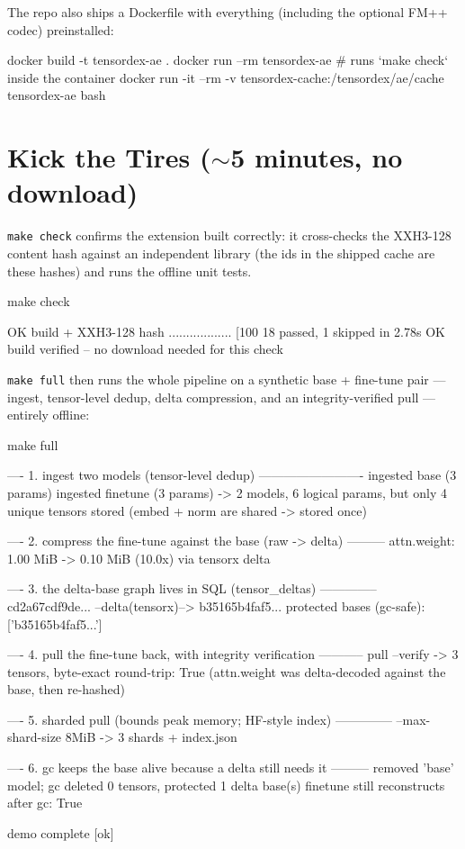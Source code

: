 \documentclass[11pt]{article}
\newcommand{\code}[1]{\texttt{#1}}
\begin{document}
The repo also ships a Dockerfile with everything (including the optional
FM++ codec) preinstalled:

\begin{shell}
docker build -t tensordex-ae .
docker run --rm tensordex-ae     # runs `make check` inside the container
docker run -it --rm -v tensordex-cache:/tensordex/ae/cache tensordex-ae bash
\end{shell}

\section{Kick the Tires ($\sim$5 minutes, no download)}

\code{make check} confirms the extension built correctly: it cross-checks the
XXH3-128 content hash against an independent library (the ids in the shipped
cache are these hashes) and runs the offline unit tests.

\begin{shell}
make check
\end{shell}
\begin{term}
OK  build + XXH3-128 hash
..................                                            [100%
18 passed, 1 skipped in 2.78s
OK  build verified -- no download needed for this check
\end{term}

\code{make full} then runs the whole pipeline on a synthetic base + fine-tune
pair --- ingest, tensor-level dedup, delta compression, and an
integrity-verified pull --- entirely offline:

\begin{shell}
make full
\end{shell}
\begin{term}
---- 1. ingest two models (tensor-level dedup) -------------------------
  ingested base      (3 params)
  ingested finetune  (3 params)
  -> 2 models, 6 logical params, but only 4 unique tensors stored
     (embed + norm are shared -> stored once)

---- 2. compress the fine-tune against the base (raw -> delta) ---------
  attn.weight: 1.00 MiB -> 0.10 MiB (10.0x) via tensorx delta

---- 3. the delta-base graph lives in SQL (tensor_deltas) --------------
  cd2a67cdf9de...  --delta(tensorx)-->  b35165b4faf5...
  protected bases (gc-safe): ['b35165b4faf5...']

---- 4. pull the fine-tune back, with integrity verification -----------
  pull --verify -> 3 tensors, byte-exact round-trip: True
  (attn.weight was delta-decoded against the base, then re-hashed)

---- 5. sharded pull (bounds peak memory; HF-style index) --------------
  --max-shard-size 8MiB -> 3 shards + index.json

---- 6. gc keeps the base alive because a delta still needs it ---------
  removed 'base' model; gc deleted 0 tensors, protected 1 delta base(s)
  finetune still reconstructs after gc: True

demo complete [ok]
\end{term}
\end{document}
